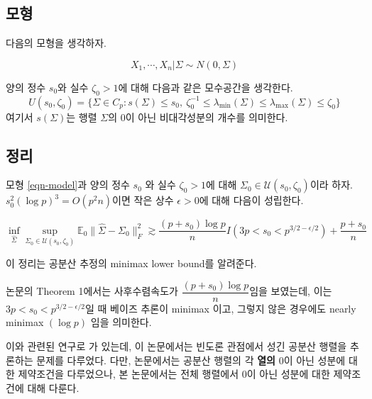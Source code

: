 \subsection{모형}

다음의 모형을 생각하자. 

\begin{equation}\label{eqn-model}
    X_1, \cdots, X_n | \Sigma \sim N(0, \Sigma)
\end{equation}

양의 정수 $s_0$와 실수 $\zeta_0 > 1$에 대해 다음과 같은 모수공간을 생각한다. 
\begin{equation*}
U(s_0, \zeta_0) = \{ \Sigma \in C_p: s(\Sigma) \leq s_0,~ \zeta_0^{-1} \leq \lambda_{\min}(\Sigma) \leq \lambda_{\max}(\Sigma) \leq \zeta_0 \}
\end{equation*}
여기서 $s(\Sigma)$는 행렬 $\Sigma$의 0이 아닌 비대각성분의 개수를 의미한다. 

\subsection{정리}

\begin{theorem}
모형 \ref{eqn-model}과 양의 정수 $s_0$ 와 실수 $\zeta_0 > 1$에 대해 $\Sigma_0 \in \mathcal{U}(s_0, \zeta_0)$이라 하자. $s_0^2 (\log p)^3 = O(p^2n)$이면 작은 상수 $\epsilon > 0$에 대해 다음이 성립한다.

\begin{equation*}
    \inf_{\hat{\Sigma}}\sup_{\Sigma_0 \in \mathcal{U}(s_0, \zeta_0)} \mathbb{E}_0 \lVert\hat{\Sigma} - \Sigma_0 \rVert_F^2 \gtrsim \frac{(p+s_0) \log p}{n} I\left(3p < s_0 < p^{3/2 - \epsilon/2}\right) + \frac{p+s_0}{n}
\end{equation*}
\end{theorem}

\begin{remark}

이 정리는 공분산 추정의 minimax lower bound를 알려준다. 

논문의 Theorem 1에서는 사후수렴속도가 $\dfrac{(p+s_0) \log p}{n}$임을 보였는데, 이는 $3p < s_0 < p^{3/2 - \epsilon/2}$일 때 베이즈 추론이 minimax 이고, 그렇지 않은 경우에도 nearly minimax $(\log p)$ 임을 의미한다.
\end{remark}

\begin{remark}
이와 관련된 연구로 \citet{cai2012optimal}가 있는데, 이 논문에서는 빈도론 관점에서 성긴 공분산 행렬을 추론하는 문제를 다루었다. 다만, 논문에서는 공분산 행렬의 각 \textbf{열의} 0이 아닌 성분에 대한 제약조건을 다루었으나, 본 논문에서는 전체 행렬에서 0이 아닌 성분에 대한 제약조건에 대해 다룬다. 
\end{remark}

